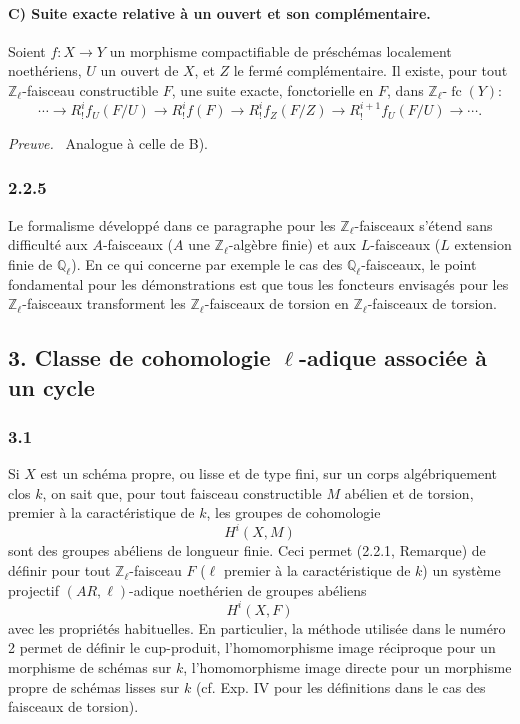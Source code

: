 \documentclass[11pt]{article}
\newenvironment{prooftext}[1][Proof]{\par\noindent\emph{#1.}\ }{\par\medskip}
\providecommand{\fc}{\operatorname{fc}}
\begin{document}
\paragraph{C) Suite exacte relative à un ouvert et son complémentaire.}
Soient \(f:X\to Y\) un morphisme compactifiable de préschémas localement noethériens, \(U\) un ouvert de \(X\), et \(Z\) le fermé complémentaire. Il existe, pour tout \(\mathbb Z_\ell\)-faisceau constructible \(F\), une suite exacte, fonctorielle en \(F\), dans \(\mathbb Z_\ell\text{-}\fc(Y)\):
\[
\cdots\longrightarrow R^i_!f_U(F/U)
\longrightarrow R^i_!f(F)
\longrightarrow R^i_!f_Z(F/Z)
\longrightarrow R^{i+1}_!f_U(F/U)
\longrightarrow\cdots .
\]

\begin{prooftext}[Preuve]
Analogue à celle de B).
\end{prooftext}

\subsubsection*{2.2.5}
Le formalisme développé dans ce paragraphe pour les \(\mathbb Z_\ell\)-faisceaux s'étend sans difficulté aux \(A\)-faisceaux (\(A\) une \(\mathbb Z_\ell\)-algèbre finie) et aux \(L\)-faisceaux (\(L\) extension finie de \(\mathbb Q_\ell\)). En ce qui concerne par exemple le cas des \(\mathbb Q_\ell\)-faisceaux, le point fondamental pour les démonstrations est que tous les foncteurs envisagés pour les \(\mathbb Z_\ell\)-faisceaux transforment les \(\mathbb Z_\ell\)-faisceaux de torsion en \(\mathbb Z_\ell\)-faisceaux de torsion.

\subsection*{3. Classe de cohomologie \(\ell\)-adique associée à un cycle}

\subsubsection*{3.1}
Si \(X\) est un schéma propre, ou lisse et de type fini, sur un corps algébriquement clos \(k\), on sait que, pour tout faisceau constructible \(M\) abélien et de torsion, premier à la caractéristique de \(k\), les groupes de cohomologie
\[
H^i(X,M)
\]
sont des groupes abéliens de longueur finie. Ceci permet (2.2.1, Remarque) de définir pour tout \(\mathbb Z_\ell\)-faisceau \(F\) (\(\ell\) premier à la caractéristique de \(k\)) un système projectif \((AR,\ell)\)-adique noethérien de groupes abéliens
\[
H^i(X,F)
\]
avec les propriétés habituelles. En particulier, la méthode utilisée dans le numéro 2 permet de définir le cup-produit, l'homomorphisme image réciproque pour un morphisme de schémas sur \(k\), l'homomorphisme image directe pour un morphisme propre de schémas lisses sur \(k\) (cf. Exp. IV pour les définitions dans le cas des faisceaux de torsion).
\end{document}
